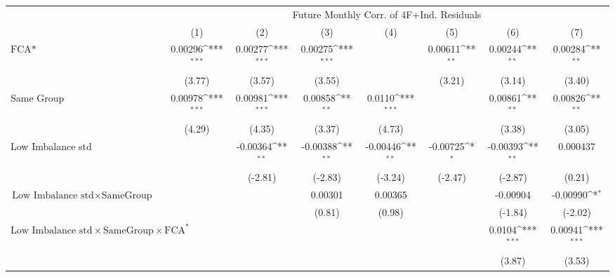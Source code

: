 {
\def\sym#1{\ifmmode^{#1}\else\(^{#1}\)\fi}
\begin{tabular}{l*{7}{c}}
\hline\hline
                &\multicolumn{7}{c}{Future Monthly Corr. of 4F+Ind. Residuals}                                                                       \\\cmidrule(lr){2-8}
                &\multicolumn{1}{c}{(1)}         &\multicolumn{1}{c}{(2)}         &\multicolumn{1}{c}{(3)}         &\multicolumn{1}{c}{(4)}         &\multicolumn{1}{c}{(5)}         &\multicolumn{1}{c}{(6)}         &\multicolumn{1}{c}{(7)}         \\
\hline
$ \text{FCA*} $ &  0.00296\sym{***}&  0.00277\sym{***}&  0.00275\sym{***}&                  &  0.00611\sym{**} &  0.00244\sym{**} &  0.00284\sym{**} \\
                &   (3.77)         &   (3.57)         &   (3.55)         &                  &   (3.21)         &   (3.14)         &   (3.40)         \\
[1em]
Same Group      &  0.00978\sym{***}&  0.00981\sym{***}&  0.00858\sym{**} &   0.0110\sym{***}&                  &  0.00861\sym{**} &  0.00826\sym{**} \\
                &   (4.29)         &   (4.35)         &   (3.37)         &   (4.73)         &                  &   (3.38)         &   (3.05)         \\
[1em]
Low Imbalance std&                  & -0.00364\sym{**} & -0.00388\sym{**} & -0.00446\sym{**} & -0.00725\sym{*}  & -0.00393\sym{**} & 0.000437         \\
                &                  &  (-2.81)         &  (-2.83)         &  (-3.24)         &  (-2.47)         &  (-2.87)         &   (0.21)         \\
[1em]
 $ \text{Low Imbalance std} \times {\text{SameGroup} } $ &                  &                  &  0.00301         &  0.00365         &                  & -0.00904         & -0.00990\sym{*}  \\
                &                  &                  &   (0.81)         &   (0.98)         &                  &  (-1.84)         &  (-2.02)         \\
[1em]
 $ \text{Low Imbalance std} \times {\text{SameGroup} } \times \text{FCA}^*  $ &                  &                  &                  &                  &                  &   0.0104\sym{***}&  0.00941\sym{***}\\
                &                  &                  &                  &                  &                  &   (3.87)         &   (3.53)         \\

\end{tabular}}
